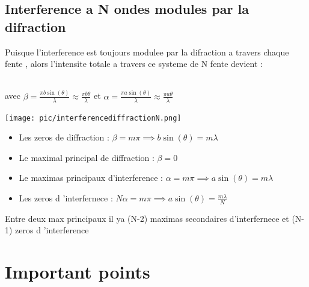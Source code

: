 \documentclass[12pt]{book}
\begin{document}
        \section{Interference a N ondes modules par la difraction}
            Puisque l'interference est toujours modulee par la difraction a travers chaque fente , alors l'intensite totale a travers ce systeme de N fente devient : \\
                \begin{center}
                    \\ 
                    avec $\beta = \frac{\pi b \sin(\theta)}{\lambda}\approx\frac{\pi b \theta}{\lambda}$ et $\alpha = \frac{\pi a \sin(\theta)}{\lambda}\approx\frac{\pi a \theta}{\lambda}$
                \end{center}
                \begin{center}
                    \begin{minipage}{0.49\linewidth}
                        \texttt{[image: pic/interferencediffractionN.png]}
                    \end{minipage}
                    \begin{minipage}{0.49\linewidth}
                        \begin{itemize}
                            \item Les zeros de diffraction : $\beta = m\pi \implies b\sin(\theta)=m\lambda$
                            \item Le maximal principal de diffraction : $\beta = 0$
                            \item Le maximas principaux d'interference : $\alpha =m\pi \implies a\sin(\theta)=m\lambda $
                            \item Les zeros d 'interfernece : $N\alpha = m\pi \implies a\sin(\theta) = \frac{m\lambda}{N}$
                        \end{itemize}
                        Entre deux max principaux il ya (N-2) maximas secondaires d'interfernece et (N-1) zeros d 'interference
                    \end{minipage}
                \end{center}
                
    \chapter*{Important points}
\end{document}

